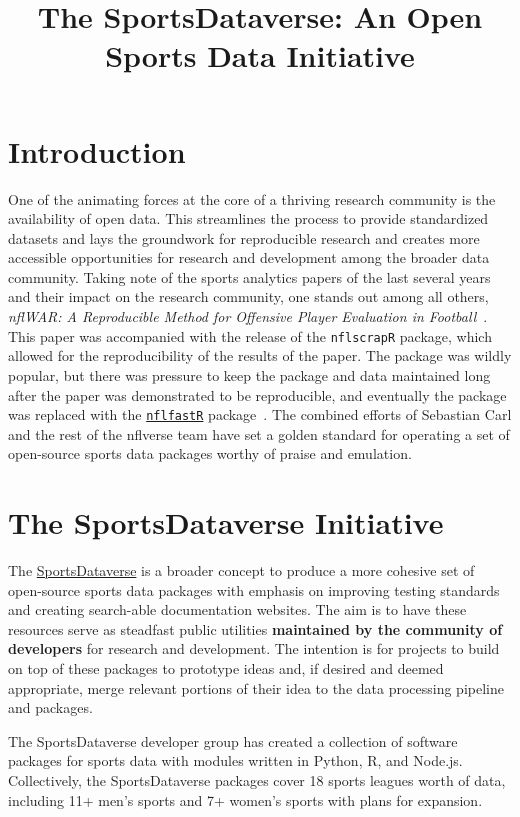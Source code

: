 \documentclass[12pt]{article}
\title{The SportsDataverse: An Open Sports Data Initiative}
\author{
}
\begin{document}
 \maketitle

\section{Introduction}
One of the animating forces at the core of a thriving research community is the availability of open data. This streamlines the process to provide standardized datasets and lays the groundwork for reproducible research and creates more accessible opportunities for research and development among the broader data community.  Taking note of the sports analytics papers of the last several years and their impact on the research community, one stands out among all others, \emph{nflWAR: A Reproducible Method for Offensive Player Evaluation in Football}~\cite{yurko_ventura_horowitz_2019}. This paper was accompanied with the release of the \texttt{nflscrapR} package, which allowed for the reproducibility of the results of the paper. The package was wildly popular, but there was pressure to keep the package and data maintained long after the paper was demonstrated to be reproducible, and eventually the package was replaced with the \href{https://www.nflfastR.com}{\texttt{nflfastR}} package~\cite{carl_baldwin_2020}. The combined efforts of Sebastian Carl and the rest of the nflverse team have set a golden standard for operating a set of open-source sports data packages worthy of praise and emulation. 

\section{The SportsDataverse Initiative}
The \href{https://sportsdataverse.org}{SportsDataverse} is a broader concept to produce a more cohesive set of open-source sports data packages with emphasis on improving testing standards and creating search-able documentation websites. The aim is to have these resources serve as steadfast public utilities \textbf{maintained by the community of developers} for research and development. The intention is for projects to build on top of these packages to prototype ideas and, if desired and deemed appropriate, merge relevant portions of their idea to the data processing pipeline and packages.

The SportsDataverse developer group has created a collection of software packages for sports data with modules written in Python, R, and Node.js. Collectively, the SportsDataverse packages cover 18 sports leagues worth of data, including 11+ men's sports and 7+ women's sports with plans for expansion. 
\end{document}
